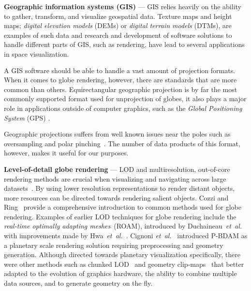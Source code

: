 \documentclass[journal]{vgtc}                %
\newcommand{\plgrem}[1]{\textcolor{blue}{~\textbf{!!}~}}
\newcommand{\etal}{\emph{et~al.}}
\begin{document}


\noindent\textbf{Geographic information systems (GIS)} --- GIS relies heavily on the ability to gather, transform, and visualize geospatial data.
Texture maps and height maps; \emph{digital elevation models} (DEMs) or \emph{digital terrain models} (DTMs), are examples of such data and research and development of software solutions to handle different parts of GIS, such as rendering, have lead to several applications in space visualization.

A GIS software should be able to handle a vast amount of projection formats. When it comes to globe rendering, however, there are standards that are more common than others.
Equirectangular geographic projection is by far the most commonly supported format used for unprojection of globes, it also plays a major role in applications outside of computer graphics, such as the \emph{Global Positioning System} (GPS) \cite{cozzi20113d}.

Geographic projections suffers from well known issues near the poles such as oversampling and polar pinching~\cite{cozzi20113d}. The number of data products of this format, however, makes it useful for our purposes.


\noindent\textbf{Level-of-detail globe rendering} ---
LOD and multiresolution, out-of-core rendering methods are crucial when visualizing and navigating across large datasets~\cite{luebke2003level}.
By using lower resolution representations to render distant objects, more resources can be directed towards rendering salient objects.
Cozzi and Ring~\cite{cozzi20113d} provide a comprehensive introduction to common methods used for globe rendering.
Examples of earlier LOD techniques for globe rendering include the \emph{real-time optimally adapting meshes}~(ROAM), introduced by Duchaineau~\etal~\cite{duchaineau1997roaming} with improvements made by Hwa~\etal~\cite{hwa2005real}.
Cignoni \etal~\cite{cignoni2003planet,cignoni2003bdam} introduced P-BDAM as a planetary scale rendering solution requiring preprocessing and geometry generation.
Although directed towards planetary visualization specifically, there were other methods such as chunked LOD~\cite{ulrich2002rendering} and geometry clip-maps~\cite{losasso2004geometry} that better adapted to the evolution of graphics hardware, the ability to combine multiple data sources, and to generate geometry on the fly.
\end{document}
